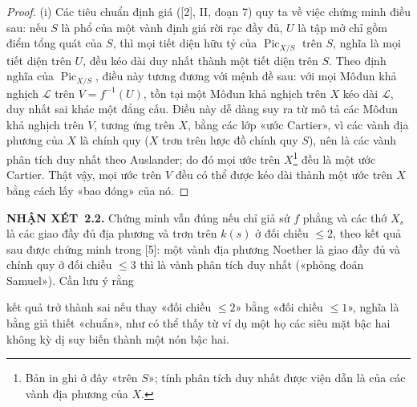 \documentclass[11pt,twoside,openany]{book}
\numberwithin{equation}{section}
\newcommand{\src}[1]{%
  \phantomsection\hypertarget{src:\fgasourceid:#1}{}%
  \marginpar{\raggedleft\footnotesize\sffamily #1}%
}
\newcommand{\fgasourceid}{unset}
\newcommand{\result}[2]{\par\medskip\noindent\textbf{#1\if\relax\detokenize{#2}\relax\else\ #2\fi.}\quad}
\begin{document}
\begin{proof}
(i) Các tiêu chuẩn định giá ([2], II, đoạn 7) quy ta về việc chứng minh điều
sau: nếu $S$ là phổ của một vành định giá rời rạc đầy đủ, $U$ là tập mở chỉ
gồm điểm tổng quát của $S$, thì mọi tiết diện hữu tỷ của
$\operatorname{Pic}_{X/S}$ trên $S$, nghĩa là mọi tiết diện trên $U$, đều kéo
dài duy nhất thành một tiết diện trên $S$. Theo định nghĩa của
$\operatorname{Pic}_{X/S}$, điều này tương đương với mệnh đề sau: với mọi
Môđun khả nghịch $\mathcal L$ trên $V=f^{-1}(U)$, tồn tại một Môđun khả nghịch
trên $X$ kéo dài $\mathcal L$, duy nhất sai khác một đẳng cấu. Điều này dễ dàng
suy ra từ mô tả các Môđun khả nghịch trên $V$, tương ứng trên $X$, bằng các
lớp «ước Cartier», vì các vành địa phương của $X$ là chính quy ($X$ trơn trên
lược đồ chính quy $S$), nên là các vành phân tích duy nhất theo Auslander; do
đó mọi ước trên $X$\footnote{Bản in ghi ở đây «trên $S$»; tính phân tích duy
nhất được viện dẫn là của các vành địa phương của $X$.} đều là một ước
Cartier. Thật vậy, mọi ước trên $V$ đều có thể được kéo dài thành một ước trên
$X$ bằng cách lấy «bao đóng» của nó.
\end{proof}

\result{NHẬN XÉT}{2.2} Chứng minh vẫn đúng nếu chỉ giả sử $f$ phẳng và các thớ
$X_s$ là các giao đầy đủ địa phương và trơn trên $k(s)$ ở đối chiều $\leq2$,
theo kết quả sau được chứng minh trong [5]: một vành địa phương Noether là giao
đầy đủ và chính quy ở đối chiều $\leq3$ thì là vành phân tích duy nhất («phỏng
đoán Samuel»). Cần lưu ý rằng
\src{232}
kết quả trở thành sai nếu thay «đối chiều $\leq2$» bằng «đối chiều
$\leq1$», nghĩa là bằng giả thiết «chuẩn», như có thể thấy từ ví dụ một họ các
siêu mặt bậc hai không kỳ dị suy biến thành một nón bậc hai.
\end{document}

